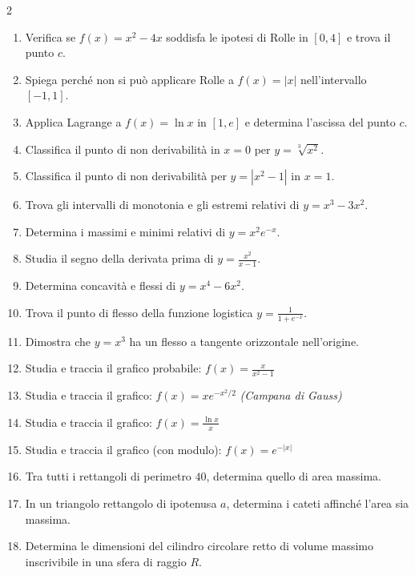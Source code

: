 \begin{multicols}{2}
\begin{enumerate}
    \item {} Verifica se $f(x) = x^2 - 4x$ soddisfa le ipotesi di Rolle in $[0,4]$ e trova il punto $c$.
    \item {} Spiega perché non si può applicare Rolle a $f(x) = |x|$ nell'intervallo $[-1,1]$.
    \item {} Applica Lagrange a $f(x) = \ln x$ in $[1, e]$ e determina l'ascissa del punto $c$.
    \item {} Classifica il punto di non derivabilità in $x=0$ per $y = \sqrt[3]{x^2}$.
    \item {} Classifica il punto di non derivabilità per $y = |x^2 - 1|$ in $x=1$.
    \item {} Trova gli intervalli di monotonia e gli estremi relativi di $y = x^3 - 3x^2$.
    \item {} Determina i massimi e minimi relativi di $y = x^2 e^{-x}$.
    \item {} Studia il segno della derivata prima di $y = \frac{x^2}{x-1}$.
    \item {} Determina concavità e flessi di $y = x^4 - 6x^2$.
    \item {} Trova il punto di flesso della funzione logistica $y = \frac{1}{1+e^{-x}}$.
    \item {} Dimostra che $y = x^3$ ha un flesso a tangente orizzontale nell'origine.
    \item {} Studia e traccia il grafico probabile: $f(x) = \frac{x}{x^2 - 1}$
    \item {} Studia e traccia il grafico: $f(x) = x e^{-x^2/2}$ \textit{(Campana di Gauss)}
    \item {} Studia e traccia il grafico: $f(x) = \frac{\ln x}{x}$
    \item {} Studia e traccia il grafico (con modulo): $f(x) = e^{-|x|}$
    \item {} Tra tutti i rettangoli di perimetro $40$, determina quello di area massima.
    \item {} In un triangolo rettangolo di ipotenusa $a$, determina i cateti affinché l'area sia massima.
    \item {} Determina le dimensioni del cilindro circolare retto di volume massimo inscrivibile in una sfera di raggio $R$.
\end{enumerate}
\end{multicols}